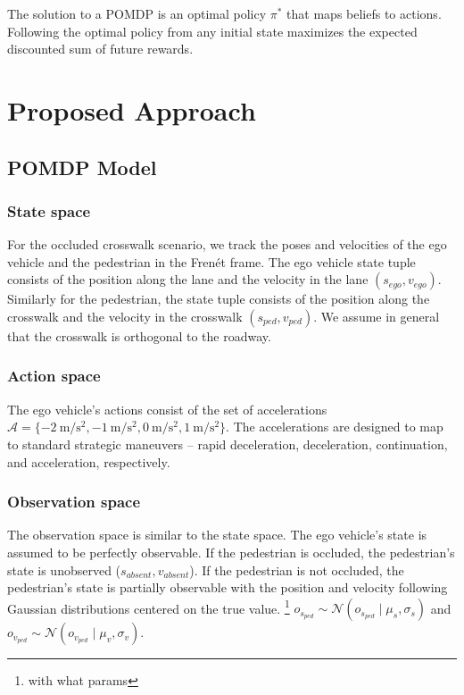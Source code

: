 \documentclass[conference]{IEEEtran}
\begin{document}
The solution to a POMDP is an optimal policy $\pi^*$ that maps beliefs to actions. Following the optimal policy from any initial state maximizes the expected discounted sum of future rewards. %

\section{Proposed Approach}
\label{sec:proposed-approach}

\subsection{POMDP Model}

\subsubsection{State space} For the occluded crosswalk scenario, we track the poses and velocities of the ego vehicle and the pedestrian in the Fren\'et frame. The ego vehicle state tuple consists of the position along the lane and the velocity in the lane $(s_{ego}, v_{ego})$. Similarly for the pedestrian, the state tuple consists of the position along the crosswalk and the velocity in the crosswalk $(s_{ped}, v_{ped})$. We assume in general that the crosswalk is orthogonal to the roadway.

\subsubsection{Action space} The ego vehicle's actions consist of the set of accelerations $\mathcal{A} = \{-2~\si{\meter\per\square\second}, -1~\si{\meter\per\square\second}, 0~\si{\meter\per\square\second}, 1~\si{\meter\per\square\second}\}$. The accelerations are designed to map to standard strategic maneuvers -- rapid deceleration, deceleration, continuation, and acceleration, respectively.

\subsubsection{Observation space} The observation space is similar to the state space. The ego vehicle's state is assumed to be perfectly observable. If the pedestrian is occluded, the pedestrian's state is unobserved ($s_{absent}, v_{absent}$). If the pedestrian is not occluded, the pedestrian's state is partially observable with the position and velocity following Gaussian distributions centered on the true value. \footnote{with what params} $o_{s_{ped}} \sim \mathcal{N}(o_{s_{ped}} \mid \mu_s, \sigma_s)$ and $o_{v_{ped}} \sim \mathcal{N}(o_{v_{ped}} \mid \mu_v, \sigma_v)$.
\end{document}

